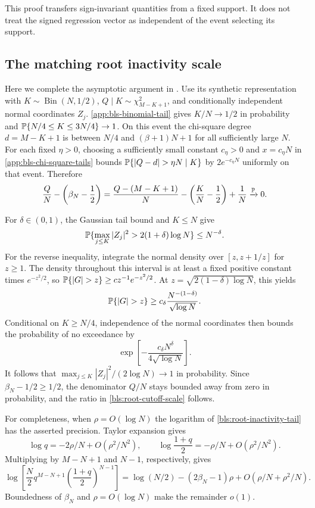 This proof transfers sign-invariant quantities from a fixed support.
It does not treat the signed regression vector as independent of the
event selecting its support.

\subsection{The matching root inactivity scale}
\label{app:bls-root-threshold-proof}

Here we complete the asymptotic argument in .
Use its synthetic representation with
$K\sim\operatorname{Bin}(N,1/2)$,
$Q\mid K\sim\chi^2_{M-K+1}$, and conditionally independent normal
coordinates $Z_j$.
\eqref{app:bls-binomial-tail} gives $K/N\to1/2$ in probability and
$\mathbb{P}\{N/4\le K\le3N/4\}\to1$.
On this event the chi-square degree $d=M-K+1$ is between $N/4$ and
$(\beta+1)N+1$ for all sufficiently large $N$.
For each fixed $\eta>0$, choosing a sufficiently small constant $c_\eta>0$
and $x=c_\eta N$ in \eqref{app:bls-chi-square-tails} bounds
$\Pbb\{|Q-d|>\eta N\mid K\}$ by $2e^{-c_\eta N}$ uniformly on
that event.  Therefore
\[
 \frac QN-\left(\beta_N-\frac12\right)
 =\frac{Q-(M-K+1)}N-\left(\frac KN-\frac12\right)+\frac1N
 \xrightarrow{\mathbb{P}}0.
\]

For $\delta\in(0,1)$, the Gaussian tail bound and $K\le N$ give
\[
 \mathbb{P}\{\max_{j\le K}|Z_j|^2>2(1+\delta)\log N\}
 \le N^{-\delta}.
\]
For the reverse inequality, integrate the normal density over
$[z,z+1/z]$ for $z\ge1$.  The density throughout this interval is at
least a fixed positive constant times $e^{-z^2/2}$, so
$\Pbb\{|G|>z\}\ge c z^{-1}e^{-z^2/2}$.
At $z=\sqrt{2(1-\delta)\log N}$, this yields
\[
 \Pbb\{|G|>z\}\ge
 c_\delta\frac{N^{-(1-\delta)}}{\sqrt{\log N}}.
\]
Conditional on $K\ge N/4$, independence of the normal coordinates then
bounds the probability of no exceedance by
\[
 \exp\left[-\frac{c_\delta N^\delta}{4\sqrt{\log N}}\right].
\]
It follows that $\max_{j\le K}|Z_j|^2/(2\log N)\to1$ in probability.
Since $\beta_N-1/2\ge1/2$, the denominator $Q/N$ stays bounded away
from zero in probability, and the ratio in
\eqref{bls:root-cutoff-scale} follows.

For completeness, when $\rho=O(\log N)$ the logarithm of
\eqref{bls:root-inactivity-tail} has the asserted precision.  Taylor
expansion gives
\[
 \log q=-2\rho/N+O(\rho^2/N^2),\qquad
 \log\frac{1+q}{2}=-\rho/N+O(\rho^2/N^2).
\]
Multiplying by $M-N+1$ and $N-1$, respectively, gives
\[
 \log\left[\frac N2q^{M-N+1}
                 \left(\frac{1+q}{2}\right)^{N-1}\right]
 =\log(N/2)-(2\beta_N-1)\rho
    +O(\rho/N+\rho^2/N).
\]
Boundedness of $\beta_N$ and $\rho=O(\log N)$ make the remainder $o(1)$.

